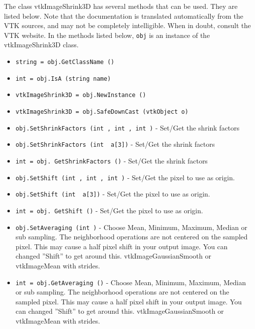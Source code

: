 The class vtkImageShrink3D has several methods that can be used.
  They are listed below.
Note that the documentation is translated automatically from the VTK sources,
and may not be completely intelligible.  When in doubt, consult the VTK website.
In the methods listed below, \verb|obj| is an instance of the vtkImageShrink3D class.
\begin{itemize}
\item  \verb|string = obj.GetClassName ()|

\item  \verb|int = obj.IsA (string name)|

\item  \verb|vtkImageShrink3D = obj.NewInstance ()|

\item  \verb|vtkImageShrink3D = obj.SafeDownCast (vtkObject o)|

\item  \verb|obj.SetShrinkFactors (int , int , int )| -  Set/Get the shrink factors

\item  \verb|obj.SetShrinkFactors (int  a[3])| -  Set/Get the shrink factors

\item  \verb|int = obj. GetShrinkFactors ()| -  Set/Get the shrink factors

\item  \verb|obj.SetShift (int , int , int )| -  Set/Get the pixel to use as origin.

\item  \verb|obj.SetShift (int  a[3])| -  Set/Get the pixel to use as origin.

\item  \verb|int = obj. GetShift ()| -  Set/Get the pixel to use as origin.

\item  \verb|obj.SetAveraging (int )| -  Choose Mean, Minimum, Maximum, Median or sub sampling.
 The neighborhood operations are not centered on the sampled pixel.
 This may cause a half pixel shift in your output image.
 You can changed ''Shift'' to get around this.
 vtkImageGaussianSmooth or vtkImageMean with strides.

\item  \verb|int = obj.GetAveraging ()| -  Choose Mean, Minimum, Maximum, Median or sub sampling.
 The neighborhood operations are not centered on the sampled pixel.
 This may cause a half pixel shift in your output image.
 You can changed ''Shift'' to get around this.
 vtkImageGaussianSmooth or vtkImageMean with strides.


\end{itemize}
